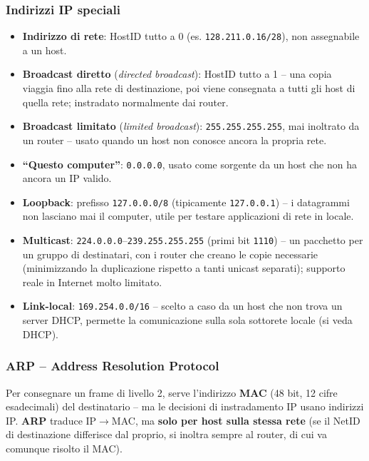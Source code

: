 \documentclass[12pt, a4paper]{article}
\begin{document}
\subsubsection{Indirizzi IP speciali}

\begin{itemize}
    \item \textbf{Indirizzo di rete}: HostID tutto a 0 (es. \texttt{128.211.0.16/28}), non assegnabile a un host.
    \item \textbf{Broadcast diretto} (\textit{directed broadcast}): HostID tutto a 1 -- una copia viaggia fino alla rete di destinazione, poi viene consegnata a tutti gli host di quella rete; instradato normalmente dai router.
    \item \textbf{Broadcast limitato} (\textit{limited broadcast}): \texttt{255.255.255.255}, mai inoltrato da un router -- usato quando un host non conosce ancora la propria rete.
    \item \textbf{``Questo computer''}: \texttt{0.0.0.0}, usato come sorgente da un host che non ha ancora un IP valido.
    \item \textbf{Loopback}: prefisso \texttt{127.0.0.0/8} (tipicamente \texttt{127.0.0.1}) -- i datagrammi non lasciano mai il computer, utile per testare applicazioni di rete in locale.
    \item \textbf{Multicast}: \texttt{224.0.0.0}--\texttt{239.255.255.255} (primi bit \texttt{1110}) -- un pacchetto per un gruppo di destinatari, con i router che creano le copie necessarie (minimizzando la duplicazione rispetto a tanti unicast separati); supporto reale in Internet molto limitato.
    \item \textbf{Link-local}: \texttt{169.254.0.0/16} -- scelto a caso da un host che non trova un server DHCP, permette la comunicazione sulla sola sottorete locale (si veda DHCP).
\end{itemize}

\subsubsection{ARP -- Address Resolution Protocol}

Per consegnare un frame di livello 2, serve l'indirizzo \textbf{MAC} (48 bit, 12 cifre esadecimali) del destinatario -- ma le decisioni di instradamento IP usano indirizzi IP. \textbf{ARP} traduce IP$\to$MAC, ma \textbf{solo per host sulla stessa rete} (se il NetID di destinazione differisce dal proprio, si inoltra sempre al router, di cui va comunque risolto il MAC).
\end{document}
